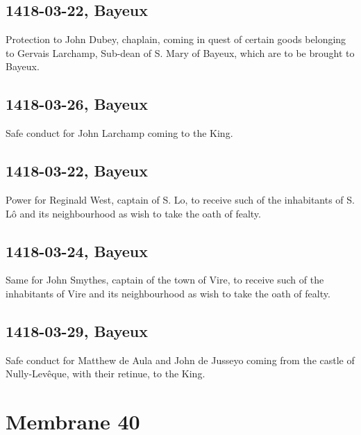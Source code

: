 \documentclass[a4paper,12pt,twoside]{book}
\begin{document}
            \subsection{1418-03-22, Bayeux}
            
                     Protection to John Dubey, chaplain, coming in quest of certain goods belonging to Gervais Larchamp, Sub-dean of S. Mary of Bayeux, which are to be brought to Bayeux.
                  
            \subsection{1418-03-26, Bayeux}
            
                     Safe conduct for John Larchamp coming to the King.
                  
            \subsection{1418-03-22, Bayeux}
            
                     Power for Reginald West, captain of S. Lo, to receive such of the inhabitants of S. Lô and its neighbourhood as wish to take the oath of fealty.
                  
            \subsection{1418-03-24, Bayeux}
            
                     Same for John Smythes, captain of the town of Vire, to receive such of the inhabitants of Vire and its neighbourhood as wish to take the oath of fealty.
                  
            \subsection{1418-03-29, Bayeux}
            
                     Safe conduct for Matthew de Aula and John de Jusseyo coming from the castle of Nully-Levêque, with their retinue, to the King.
                  
            \newpage
        
        \section{Membrane 40}
        
\end{document}
